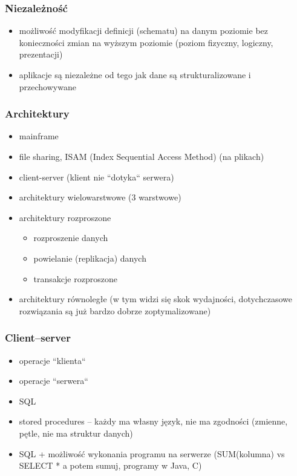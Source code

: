 \documentclass[12pt]{article}
\begin{document}
\subsubsection{Niezależność}
\begin{itemize}
\item możliwość modyfikacji definicji (schematu) na danym poziomie bez konieczności zmian na wyższym poziomie
   (poziom fizyczny, logiczny, prezentacji)
\item aplikacje są niezależne od tego jak dane są strukturalizowane i przechowywane
\end{itemize}

\subsubsection{Architektury}
\begin{itemize}
\item  mainframe
\item  file sharing, ISAM (Index Sequential Access Method) (na plikach)
\item  client-server (klient nie ``dotyka`` serwera)
\item  architektury wielowarstwowe (3 warstwowe)
\item  architektury rozproszone
\begin{itemize}
\item  rozproszenie danych
\item powielanie (replikacja) danych
\item transakcje rozproszone
\end{itemize}
\item  architektury równoległe (w tym widzi się skok wydajności, dotychczasowe rozwiązania są już
   bardzo dobrze zoptymalizowane)
\end{itemize}

\subsubsection{Client--server}
\begin{itemize}
\item operacje ``klienta``
\item operacje ``serwera``
\item SQL
\item stored procedures -- każdy ma własny język, nie ma zgodności (zmienne, pętle, nie ma struktur danych)
\item SQL + możliwość wykonania programu na serwerze (SUM(kolumna) vs SELECT * a potem sumuj, programy w Java, C)
\end{itemize}
\end{document}
